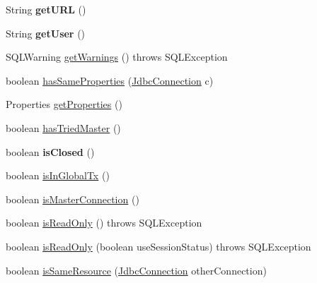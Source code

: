 \begin{DoxyCompactItemize}
String {\bfseries get\+U\+RL} ()
\item 
\mbox{\label{classcom_1_1mysql_1_1cj_1_1jdbc_1_1_connection_impl_afbb744e880f00dfaf434498ab5cbceba}} 
String {\bfseries get\+User} ()
\item 
S\+Q\+L\+Warning \mbox{\hyperlink{classcom_1_1mysql_1_1cj_1_1jdbc_1_1_connection_impl_a960584f75700b7d6f8418590e4474b03}{get\+Warnings}} ()  throws S\+Q\+L\+Exception 
\item 
boolean \mbox{\hyperlink{classcom_1_1mysql_1_1cj_1_1jdbc_1_1_connection_impl_a498f67a53c8188e4827e838ed9dd3356}{has\+Same\+Properties}} (\mbox{\hyperlink{interfacecom_1_1mysql_1_1cj_1_1jdbc_1_1_jdbc_connection}{Jdbc\+Connection}} c)
\item 
Properties \mbox{\hyperlink{classcom_1_1mysql_1_1cj_1_1jdbc_1_1_connection_impl_a63bb38c4e47986e5b187fb3fefb9aec6}{get\+Properties}} ()
\item 
boolean \mbox{\hyperlink{classcom_1_1mysql_1_1cj_1_1jdbc_1_1_connection_impl_acc9cbd5c4e0570757e05993e123c5696}{has\+Tried\+Master}} ()
\item 
\mbox{\label{classcom_1_1mysql_1_1cj_1_1jdbc_1_1_connection_impl_a4d32ea019819ff99edce873df7e4aa35}} 
boolean {\bfseries is\+Closed} ()
\item 
boolean \mbox{\hyperlink{classcom_1_1mysql_1_1cj_1_1jdbc_1_1_connection_impl_a36d32f1c890a8774776f435a8d7a9f55}{is\+In\+Global\+Tx}} ()
\item 
boolean \mbox{\hyperlink{classcom_1_1mysql_1_1cj_1_1jdbc_1_1_connection_impl_a5ba146293ff6812bf52d5baf61f66e02}{is\+Master\+Connection}} ()
\item 
boolean \mbox{\hyperlink{classcom_1_1mysql_1_1cj_1_1jdbc_1_1_connection_impl_a1bd9587a13c01e6f58570c837024cf2d}{is\+Read\+Only}} ()  throws S\+Q\+L\+Exception 
\item 
boolean \mbox{\hyperlink{classcom_1_1mysql_1_1cj_1_1jdbc_1_1_connection_impl_ab81709d56fbf320b82e513a770342a90}{is\+Read\+Only}} (boolean use\+Session\+Status)  throws S\+Q\+L\+Exception 
\item 
boolean \mbox{\hyperlink{classcom_1_1mysql_1_1cj_1_1jdbc_1_1_connection_impl_a0eec8abab54aa4e2f6789b0d3db561e4}{is\+Same\+Resource}} (\mbox{\hyperlink{interfacecom_1_1mysql_1_1cj_1_1jdbc_1_1_jdbc_connection}{Jdbc\+Connection}} other\+Connection)
\item 

\end{DoxyCompactItemize}
